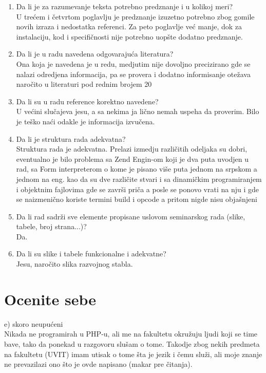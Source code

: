 \documentclass[a4paper]{report}
\begin{document}
\begin{enumerate}
\item Da li je za razumevanje teksta potrebno predznanje i u kolikoj meri?\\
U trećem i četvrtom poglavlju je predznanje izuzetno potrebno zbog gomile novih izraza i nedostatka referenci. Za peto poglavlje već manje, dok za instalaciju, kod i specifičnosti nije potrebno uopšte dodatno predznanje. 
\item Da li je u radu navedena odgovarajuća literatura?\\
Ona koja je navedena je u redu, medjutim nije dovoljno precizirano gde se nalazi odredjena informacija, pa se provera i dodatno informisanje otežava naročito u literaturi pod rednim brojem 20
\item Da li su u radu reference korektno navedene?\\
U većini slučajeva jesu, a sa nekima ja lično nemah uspeha da proverim. Bilo je teško naći odakle je informacija izvučena.
\item Da li je struktura rada adekvatna?\\
Struktura rada je adekvatna. Prelazi izmedju različitih odeljaka su dobri, eventualno je bilo problema sa Zend Engin-om koji je dva puta uvodjen u rad, sa Form interpreterom o kome je pisano više puta jednom na srpskom a jednom na eng. kao da su dve različite stvari i sa dinamičkim programiranjem i objektnim fajlovima gde se završi priča a posle se ponovo vrati na nju i gde se naizmenično koriste termini build i opcode a pritom nigde nisu objašnjeni
\item Da li rad sadrži sve elemente propisane uslovom seminarskog rada (slike, tabele, broj strana...)?\\
Da. 
\item Da li su slike i tabele funkcionalne i adekvatne?\\
Jesu, naročito slika razvojnog stabla. 
\end{enumerate}

\section{Ocenite sebe}
 e) skoro neupućeni\\
Nikada ne programirah u PHP-u, ali me na fakultetu okružuju ljudi koji se time bave, tako da ponekad u razgovoru slušam o tome. Takodje zbog nekih predmeta na fakultetu (UVIT) imam utisak o tome šta je jezik i čemu služi, ali moje znanje ne prevazilazi ono što je ovde napisano (makar pre čitanja). 
\end{document}
